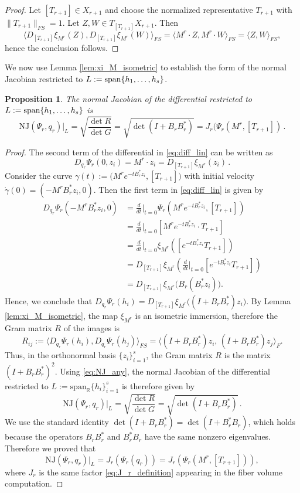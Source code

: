 \documentclass{article}
\newtheorem{proposition}[theorem]{Proposition}
\theoremstyle{definition}
\newcommand{\NJ}{\mathrm{NJ}}
\begin{document}
\begin{proof}
Let \([T_{r+1}]\in X_{r+1}\) and choose the normalized representative \(T_{r+1}\) with \(\|T_{r+1}\|_{FS}=1\).
Let \(Z,W\in T_{[T_{r+1}]}X_{r+1}\). Then
\[
\langle D_{[T_{r+1}]}\xi_{M^r}(Z), D_{[T_{r+1}]}\xi_{M^r}(W)\rangle_{FS} = \langle M^r\cdot Z, M^r \cdot W\rangle_{FS} = \langle Z,W\rangle_{FS}, 
\]
hence the conclusion follows.
\end{proof}
\noindent
We now use Lemma \ref{lem:xi_M_isometric} to establish the form of the normal Jacobian restricted to $L:={\rm span}\{h_1,\dots,h_s\}$.
\begin{proposition}\label{prop:NJ_rest_L}
    The normal Jacobian of the differential restricted to $L:={\rm span}\{h_1,\dots,h_s\}$ is
\[
\NJ\left(\Psi_r, q_r\right)|_L
=
\sqrt{\frac{\det R}{\det G}} = \sqrt{\det(I+B_rB_r^*)} = J_r(\Psi_r(M^r,[T_{r+1}])\,.
\]
\end{proposition}
\begin{proof}
    The second term of the differential in \eqref{eq:diff_lin} can be written as
\[
D_{q_r}\Psi_r(0,z_i)
=
M^r\cdot z_i = D_{[T_{r+1}]}\xi_{M^r}(z_i)\,.
\]
Consider the curve $\gamma(t):=\bigl(M^re^{-tB_r^*z_i},[T_{r+1}]\bigr)$ with initial velocity  $\dot\gamma(0)=(-M^rB_r^*z_i,0)$.
Then the first term in \eqref{eq:diff_lin} is given by
\begin{align*}
    D_{q_r}\Psi_r(-M^rB_r^*z_i,0)
&=
\frac{d}{dt}\bigg|_{t=0}
\Psi_r(M^re^{-tB_r^*z_i},[T_{r+1}])  \\
&=
\frac{d}{dt}\bigg|_{t=0}
[M^re^{-tB_r^*z_i}\cdot T_{r+1}]  \\
&=
\frac{d}{dt}\bigg|_{t=0}
\xi_{M^r}([e^{-tB_r^*z_i}T_{r+1}])  \\
&=
D_{[T_{r+1}]}\xi_{M^r}
\left(
\frac{d}{dt}\bigg|_{t=0}
[e^{-tB_r^*z_i}T_{r+1}]
\right)  \\
&=
D_{[T_{r+1}]}\xi_{M^r}\bigl(B_r(B_r^*z_i)\bigr).
\end{align*}
Hence, we conclude that $D_{q_r}\Psi_r(h_i)
=
D_{[T_{r+1}]}\xi_{M^r}\bigl((I+B_rB_r^*)z_i\bigr)$.
By Lemma \ref{lem:xi_M_isometric}, the map \(\xi_{M^r}\) is an isometric immersion, therefore the Gram matrix $R$ of the images is 
\[
R_{ij}:=
\big\langle D_{q_r}\Psi_r(h_i),D_{q_r}\Psi_r(h_j)\big\rangle_{FS} = \big\langle (I+B_rB_r^*)z_i,\,(I+B_rB_r^*)z_j\big\rangle_{F}.
\]
Thus, in the orthonormal basis \(\{z_i\}_{i=1}^s\), the Gram matrix \(R\) is the matrix $(I+B_rB_r^*)^2$. Using \eqref{eq:NJ_any}, the normal Jacobian of the differential restricted to $L:=\mathrm{span}_{\mathbb R}\{h_i\}_{i=1}^{s}$ is therefore given by
\[
\NJ\left(\Psi_r, q_r\right)|_L
=
\sqrt{\frac{\det R}{\det G}} = \sqrt{\det(I+B_rB_r^*)}\,.
\]
We use the standard identity $\det(I+B_rB_r^*)=\det(I+B_r^*B_r)$,
which holds because the operators \(B_rB_r^*\) and \(B_r^*B_r\) have the same nonzero eigenvalues.
Therefore we proved that
\[
\NJ\left(\Psi_r, q_r\right)|_L
=
J_r(\Psi_r(q_r))
= J_r(\Psi_r(M^r, [T_{r+1}])),
\]
where $J_r$ is the same factor \eqref{eq:J_r_definition} appearing in the fiber volume computation. 
\end{proof}
\end{document}
